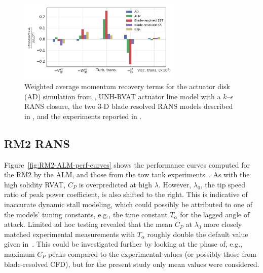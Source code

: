 \documentclass[times]{weauth}
\begin{document}
\begin{figure}
    \centering

    \includegraphics[width=0.7\textwidth]{RVAT-ALM_recovery-bar-chart}

    \caption{Weighted average momentum recovery terms for the actuator disk (AD)
        simulation from \cite{Bachant2015-JoT}, UNH-RVAT actuator line model with a
        $k$--$\epsilon$ RANS closure, the two 3-D blade resolved RANS models
        described in \cite{Bachant2016-BR-CFD}, and the experiments reported in
        \cite{Bachant2015-JoT}.}

    \label{fig:RVAT-ALM-recovery}
\end{figure}


\subsection{RM2 RANS}

Figure~\ref{fig:RM2-ALM-perf-curves} shows the performance curves computed for
the RM2 by the ALM, and those from the tow tank
experiments~\cite{Bachant2016-RM2-paper}. As with the high solidity RVAT, $C_P$
is overpredicted at high $\lambda$. However, $\lambda_0$, the tip speed ratio of
peak power coefficient, is also shifted to the right. This is indicative of
inaccurate dynamic stall modeling, which could possibly be attributed to one of
the models' tuning constants, e.g., the time constant $T_\alpha$ for the lagged
angle of attack. Limited ad hoc testing revealed that the mean $C_P$ at
$\lambda_0$ more closely matched experimental measurements with $T_\alpha$
roughly double the default value given in~\cite{Sheng2008}. This could be
investigated further by looking at the phase of, e.g., maximum $C_P$ peaks
compared to the experimental values (or possibly those from blade-resolved CFD),
but for the present study only mean values were considered.
\end{document}
